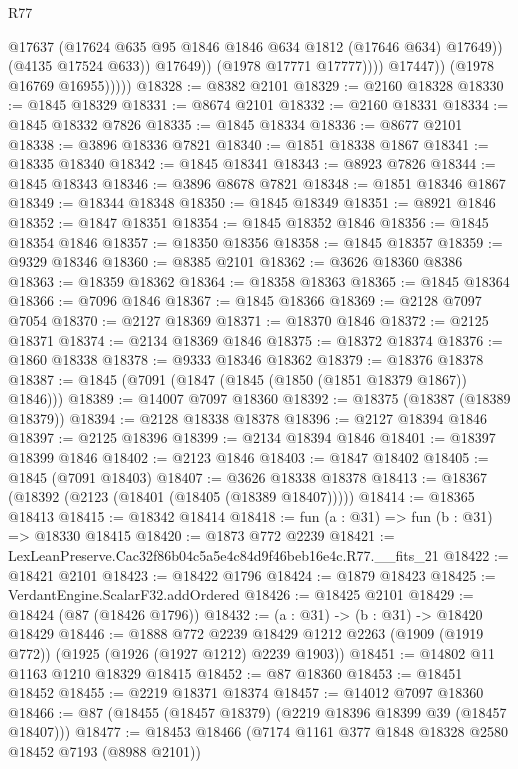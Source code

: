 \begin{lexlean}{R77}
\begin{coremodule}
                              @17637
                              (@17624 @635 @95 @1846 @1846 @634 @1812 (@17646 @634) @17649))
                            (@4135 @17524 @633))
                          @17649))
                      (@1978 @17771 @17777))))
                @17447))
            (@1978 @16769 @16955)))))
@18328 := @8382 @2101
@18329 := @2160 @18328
@18330 := @1845 @18329
@18331 := @8674 @2101
@18332 := @2160 @18331
@18334 := @1845 @18332 @7826
@18335 := @1845 @18334
@18336 := @8677 @2101
@18338 := @3896 @18336 @7821
@18340 := @1851 @18338 @1867
@18341 := @18335 @18340
@18342 := @1845 @18341
@18343 := @8923 @7826
@18344 := @1845 @18343
@18346 := @3896 @8678 @7821
@18348 := @1851 @18346 @1867
@18349 := @18344 @18348
@18350 := @1845 @18349
@18351 := @8921 @1846
@18352 := @1847 @18351
@18354 := @1845 @18352 @1846
@18356 := @1845 @18354 @1846
@18357 := @18350 @18356
@18358 := @1845 @18357
@18359 := @9329 @18346
@18360 := @8385 @2101
@18362 := @3626 @18360 @8386
@18363 := @18359 @18362
@18364 := @18358 @18363
@18365 := @1845 @18364
@18366 := @7096 @1846
@18367 := @1845 @18366
@18369 := @2128 @7097 @7054
@18370 := @2127 @18369
@18371 := @18370 @1846
@18372 := @2125 @18371
@18374 := @2134 @18369 @1846
@18375 := @18372 @18374
@18376 := @1860 @18338
@18378 := @9333 @18346 @18362
@18379 := @18376 @18378
@18387 := @1845 (@7091 (@1847 (@1845 (@1850 (@1851 @18379 @1867)) @1846)))
@18389 := @14007 @7097 @18360
@18392 := @18375 (@18387 (@18389 @18379))
@18394 := @2128 @18338 @18378
@18396 := @2127 @18394 @1846
@18397 := @2125 @18396
@18399 := @2134 @18394 @1846
@18401 := @18397 @18399 @1846
@18402 := @2123 @1846
@18403 := @1847 @18402
@18405 := @1845 (@7091 @18403)
@18407 := @3626 @18338 @18378
@18413 := @18367 (@18392 (@2123 (@18401 (@18405 (@18389 @18407)))))
@18414 := @18365 @18413
@18415 := @18342 @18414
@18418 := fun (a : @31) => fun (b : @31) => @18330 @18415
@18420 := @1873 @772 @2239
@18421 := LexLeanPreserve.Cac32f86b04c5a5e4c84d9f46beb16e4c.R77.__fits_21
@18422 := @18421 @2101
@18423 := @18422 @1796
@18424 := @1879 @18423
@18425 := VerdantEngine.ScalarF32.addOrdered
@18426 := @18425 @2101
@18429 := @18424 (@87 (@18426 @1796))
@18432 := (a : @31) -> (b : @31) -> @18420 @18429
@18446 := @1888
    @772
    @2239
    @18429
    @1212
    @2263
    (@1909 (@1919 @772))
    (@1925 (@1926 (@1927 @1212) @2239 @1903))
@18451 := @14802 @11 @1163 @1210 @18329 @18415
@18452 := @87 @18360
@18453 := @18451 @18452
@18455 := @2219 @18371 @18374
@18457 := @14012 @7097 @18360
@18466 := @87 (@18455 (@18457 @18379) (@2219 @18396 @18399 @39 (@18457 @18407)))
@18477 := @18453 @18466 (@7174 @1161 @377 @1848 @18328 @2580 @18452 @7193 (@8988 @2101))

\end{coremodule}
\end{lexlean}
